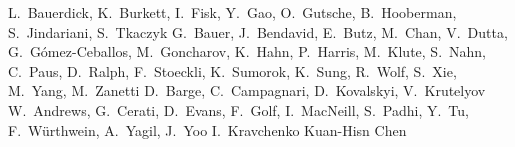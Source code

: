 \begin{Authlist}
%
L.~Bauerdick, K.~Burkett, I.~Fisk, Y.~Gao, O.~Gutsche, B.~Hooberman, S.~Jindariani, S.~Tkaczyk
%
G.~Bauer, J.~Bendavid, E.~Butz, M.~Chan, V.~Dutta, G.~G\'omez-Ceballos, M.~Goncharov, K.~Hahn, P.~Harris, M.~Klute, S.~Nahn, C.~Paus, D.~Ralph, F.~Stoeckli, K.~Sumorok, K.~Sung, R.~Wolf, S.~Xie, M.~Yang, M.~Zanetti
%
D.~Barge, C.~Campagnari, D.~Kovalskyi, V.~Krutelyov
%
W.~Andrews, G.~Cerati, D.~Evans, F.~Golf, I.~MacNeill, S.~Padhi, Y.~Tu, F.~W\"urthwein, A.~Yagil, J.~Yoo
%
I.~Kravchenko
%
Kuan-Hisn Chen

\end{Authlist}
